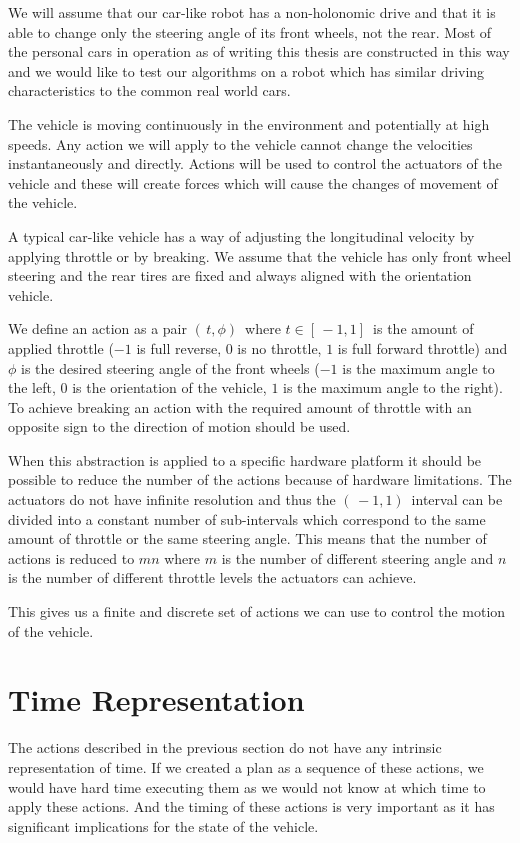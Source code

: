 We will assume that our car-like robot has a non-holonomic drive and that it is able to change only the steering angle of its front wheels, not the rear. Most of the personal cars in operation as of writing this thesis are constructed in this way and we would like to test our algorithms on a robot which has similar driving characteristics to the common real world cars.

The vehicle is moving continuously in the environment and potentially at high speeds. Any action we will apply to the vehicle cannot change the velocities instantaneously and directly. Actions will be used to control the actuators of the vehicle and these will create forces which will cause the changes of movement of the vehicle.

A typical car-like vehicle has a way of adjusting the longitudinal velocity by applying throttle or by breaking. We assume that the vehicle has only front wheel steering and the rear tires are fixed and always aligned with the orientation vehicle.

We define an action as a pair $( \, t, \phi ) \,$ where $t \in [ \, -1, 1 ] \,$ is the amount of applied throttle ($-1$ is full reverse, $0$ is no throttle, $1$ is full forward throttle) and $\phi$ is the desired steering angle of the front wheels ($-1$ is the maximum angle to the left, $0$ is the orientation of the vehicle, $1$ is the maximum angle to the right). To achieve breaking an action with the required amount of throttle with an opposite sign to the direction of motion should be used.

When this abstraction is applied to a specific hardware platform it should be possible to reduce the number of the actions because of hardware limitations. The actuators do not have infinite resolution and thus the $( \, -1, 1 ) \,$ interval can be divided into a constant number of sub-intervals which correspond to the same amount of throttle or the same steering angle. This means that the number of actions is reduced to $mn$ where $m$ is the number of different steering angle and $n$ is the number of different throttle levels the actuators can achieve.

This gives us a finite and discrete set of actions we can use to control the motion of the vehicle.

\section{Time Representation}

The actions described in the previous section do not have any intrinsic representation of time. If we created a plan as a sequence of these actions, we would have hard time executing them as we would not know at which time to apply these actions. And the timing of these actions is very important as it has significant implications for the state of the vehicle.

